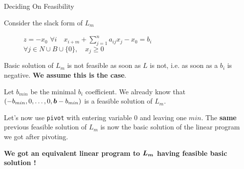 \documentclass[32pt, aspectratio = 169]{beamer}
\begin{document}
\begin{frame}{Deciding On Feasibility}
    \setlength\columnseprule{.1pt}
    \begin{multicols}{2}
        Consider the slack form of $L_{m}$
        \begin{figure}
            \begin{linearProgG}{
                ${\displaystyle z = -x_0}$
                }{
                ${\displaystyle \forall i \quad x_{i + m} + \sum_{j=1}^n a_{ij}x_j - x_0 = b_i}$
                }{
                $\forall j \in N\cup B \cup\{0 \}, \quad x_j \geq 0$
                }
            \end{linearProgG}
        \end{figure}
        \pause
        Basic solution of $L_{m}$ is not feasible as soon as $L$ is
        not, i.e. as soon as a $b_i$ is negative. \alert{\textbf{We
            assume this is the case}}.

        \pause
        Let $b_{min}$ be the minimal $b_i$ coefficient. We already
        know that
        $(-b_{min}, 0, \ldots, 0, \boldsymbol{b} - b_{min})$
        is a feasible solution of
        $L_{m}$.

        \pause
        Let's now use \texttt{pivot} with entering
        variable $0$ and leaving one $min$. The \alert{\textbf{same}}
        previous feasible solution of $L_{m}$ is now the basic
        solution of the linear program we got after pivoting.
        \vspace{.5\baselineskip}

        \pause
        \textbf{We got an equivalent linear program to $\boldsymbol{L_{m}}$
          having feasible basic solution !}
    \end{multicols}
\end{frame}
\end{document}
